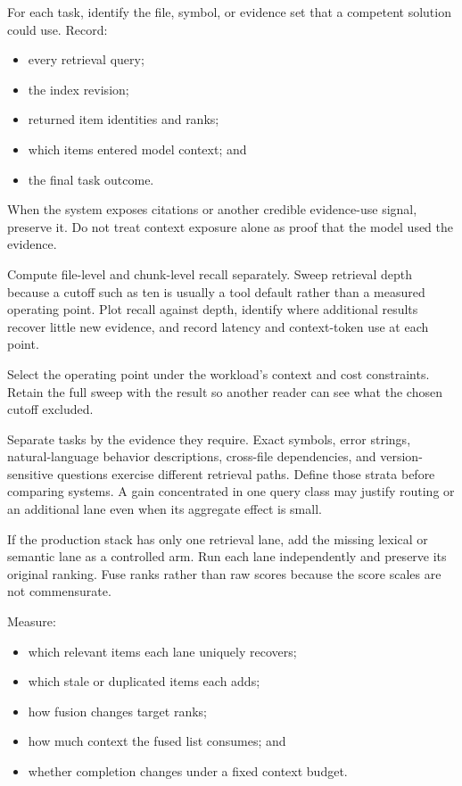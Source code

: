 
For each task, identify the file, symbol, or evidence set that a competent solution could use. Record:

\begin{itemize}
\tightlist
\item
  every retrieval query;
\item
  the index revision;
\item
  returned item identities and ranks;
\item
  which items entered model context; and
\item
  the final task outcome.
\end{itemize}

When the system exposes citations or another credible evidence-use signal, preserve it. Do not treat context exposure alone as proof that the model used the evidence.

Compute file-level and chunk-level recall separately. Sweep retrieval depth because a cutoff such as ten is usually a tool default rather than a measured operating point. Plot recall against depth, identify where additional results recover little new evidence, and record latency and context-token use at each point.

Select the operating point under the workload's context and cost constraints. Retain the full sweep with the result so another reader can see what the chosen cutoff excluded.

Separate tasks by the evidence they require. Exact symbols, error strings, natural-language behavior descriptions, cross-file dependencies, and version-sensitive questions exercise different retrieval paths. Define those strata before comparing systems. A gain concentrated in one query class may justify routing or an additional lane even when its aggregate effect is small.

If the production stack has only one retrieval lane, add the missing lexical or semantic lane as a controlled arm. Run each lane independently and preserve its original ranking. Fuse ranks rather than raw scores because the score scales are not commensurate.


Measure:

\begin{itemize}
\tightlist
\item
  which relevant items each lane uniquely recovers;
\item
  which stale or duplicated items each adds;
\item
  how fusion changes target ranks;
\item
  how much context the fused list consumes; and
\item
  whether completion changes under a fixed context budget.
\end{itemize}

